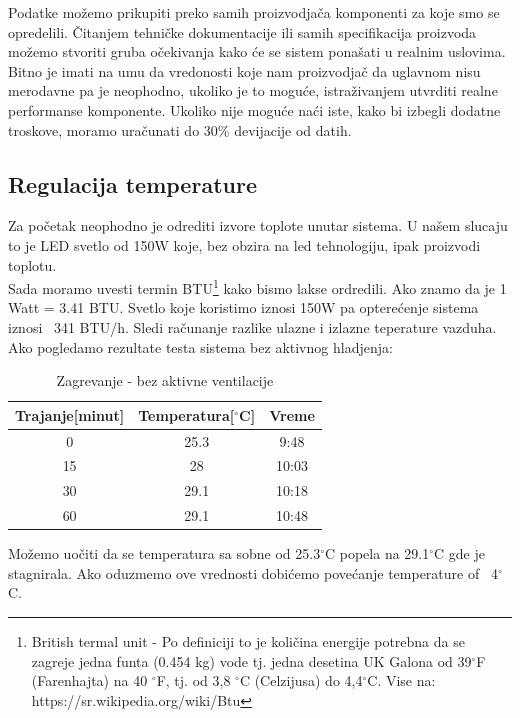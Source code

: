 \documentclass[a4paper,11pt]{book}
\begin{document}
Podatke možemo prikupiti preko samih proizvodjača komponenti za koje smo se opredelili. Čitanjem tehničke dokumentacije ili samih specifikacija proizvoda možemo stvoriti gruba očekivanja kako će se sistem ponašati u realnim uslovima. \\

\noindent Bitno je imati na umu da vredonosti koje nam proizvodjač da uglavnom nisu merodavne pa je neophodno, ukoliko je to moguće, istraživanjem utvrditi realne performanse komponente. Ukoliko nije moguće naći iste, kako bi izbegli dodatne troskove, moramo uračunati do 30\% devijacije od datih.

\subsection{Regulacija temperature}

Za početak neophodno je odrediti izvore toplote unutar sistema. U našem slucaju to je LED svetlo od 150W koje, bez obzira na led tehnologiju, ipak proizvodi toplotu.\\

Sada moramo uvesti termin BTU\footnote{British termal unit - Po definiciji to je količina energije potrebna da se zagreje jedna funta (0.454 kg) vode tj. jedna desetina UK Galona od 39$^\circ$F (Farenhajta) na 40 $^\circ$F, tj. od 3,8 $^\circ$C (Celzijusa) do 4,4$^\circ$C. Vise na: https://sr.wikipedia.org/wiki/Btu} kako bismo lakse ordredili. Ako znamo da je 1 Watt = 3.41 BTU. Svetlo koje koristimo iznosi 150W pa opterećenje sistema iznosi ~341 BTU/h. Sledi računanje razlike ulazne i izlazne teperature vazduha. Ako pogledamo rezultate testa sistema bez aktivnog hladjenja:


\begin{table}[ht]
  \caption{Zagrevanje - bez aktivne ventilacije}
  \centering
  \begin{tabular}{|c|c|c|}
  \hline
    Trajanje[minut] & Temperatura[$^\circ$C] & Vreme\\ \hline
  0 & 25.3 & 9:48 \\ \hline
  15 & 28 & 10:03 \\ \hline
  30 & 29.1 & 10:18 \\ \hline
  60 & 29.1 & 10:48 \\ \hline
  \end{tabular}
\end{table}

Možemo uočiti da se temperatura sa sobne od 25.3$^\circ$C popela na 29.1$^\circ$C gde je stagnirala. Ako oduzmemo ove vrednosti dobićemo povećanje temperature of ~4$^\circ$C.
\end{document}
